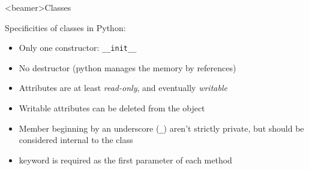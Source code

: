 \begin{frame}<beamer>{Classes}

  Specificities of classes in Python:

  \begin{itemize}
    \item<2-> Only one constructor: \lstinline|__init__|
    \item<3-> No destructor (python manages the memory by references)
    \item<4-> Attributes are at least \textit{read-only}, and eventually \textit{writable}
    \item<5-> Writable attributes can be deleted from the object
    \item<6-> Member beginning by an underscore (\lstinline|_|) aren't strictly private, but should be considered internal to the class
    \item<7->  keyword is required as the first parameter of each method
  \end{itemize}

\end{frame}


